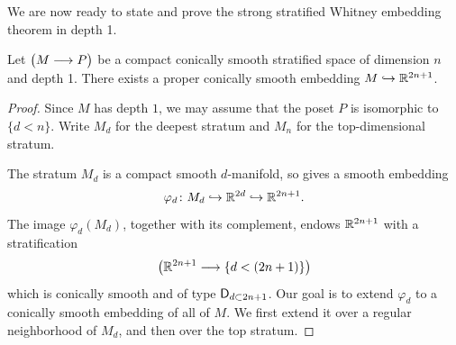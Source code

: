 We are now ready to state and prove the strong stratified Whitney embedding theorem in depth 1.

\begin{proposition}\label{ch4:: prop: Whitney strong depth 1}
    Let $\big(  M\longrightarrow P \big)$ be a compact conically smooth stratified space of dimension $n$ and depth 1. There exists a proper conically smooth embedding $M \hookrightarrow \mathbb R^{2n + 1}$.
\end{proposition}

\begin{proof}
    Since $M$ has depth $1$, we may assume that the poset $P$ is isomorphic to $\{d<n\}$. Write $M_d$ for the deepest stratum and $M_n$ for the top-dimensional stratum.
    
    The stratum $M_d$ is a compact smooth $d$-manifold, so  gives a smooth embedding
    \begin{equation}
        \varphi_d \colon M_d \hookrightarrow \mathbb R^{2d} \hookrightarrow \mathbb R^{2n+1}.
    \end{equation}
    The image $\varphi_d(M_d)$, together with its complement, endows $\mathbb R^{2n+1}$ with a stratification 
    \begin{equation}
        \label{eq:ch7::image of embedding}
        \big(\mathbb R^{2n+1} \longrightarrow \{d < (2n + 1)\}\big)
    \end{equation}    
    which is conically smooth and of type $\mathsf D_{d\subset 2n+1}$. Our goal is to extend $\varphi_d$ to a conically smooth embedding of all of $M$. We first extend it over a regular neighborhood of $M_d$, and then over the top stratum.


\end{proof}

